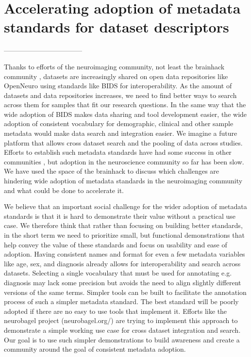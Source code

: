 \documentclass[../main.tex]{subfiles}
\begin{document}
\section{Accelerating adoption of metadata standards for dataset descriptors}



-----------------------------------

Thanks to efforts of the neuroimaging community, not least the brainhack community \parencite{Gau2021}, datasets are increasingly shared on open data repositories like OpenNeuro \parencite{Markiewicz2021-bf} using standards like BIDS \parencite{Gorgolewski2016-bp} for interoperability. As the amount of datasets and data repositories increases, we need to find better ways to search across them for samples that fit our research questions. In the same way that the wide adoption of BIDS makes data sharing and tool development easier, the wide adoption of consistent vocabulary for demographic, clinical and other sample metadata would make data search and integration easier. We imagine a future platform that allows cross dataset search and the pooling of data across studies. Efforts to establish such metadata standards have had some success in other communities \parencite{Field2008-kw, Stang2010-nl}, but adoption in the neuroscience community so far has been slow. We have used the space of the brainhack to discuss which challenges are hindering wide adoption of metadata standards in the neuroimaging community and what could be done to accelerate it.

We believe that an important social challenge for the wider adoption of metadata standards is that it is hard to demonstrate their value without a practical use case. We therefore think that rather than focusing on building better standards, in the short term we need to prioritize small, but functional demonstrations that help convey the value of these standards and focus on usability and ease of adoption. Having consistent names and format for even a few metadata variables like age, sex, and diagnosis already allows for interoperability and search across datasets. Selecting a single vocabulary that must be used for annotating e.g. diagnosis may lack some precision but avoids the need to align slightly different versions of the same terms. Simpler tools can be built to facilitate the annotation process of such a simpler metadata standard. The best standard will be poorly adopted if there are no easy to use tools that implement it. Efforts like the neurobagel project (neurobagel.org/) are trying to implement this approach to demonstrate a simple working use case for cross dataset integration and search. Our goal is to use such simpler demonstrations to build awareness and create a community around the goal of consistent metadata adoption.
\end{document}
